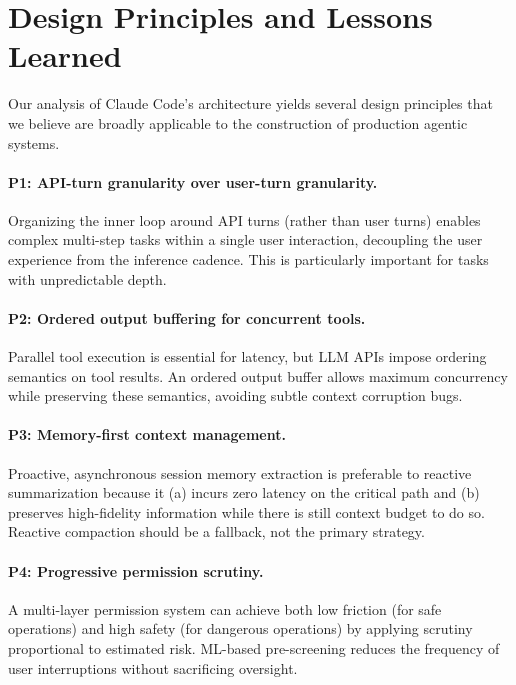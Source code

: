 \documentclass{article}
\begin{document}
\section{Design Principles and Lessons Learned}

Our analysis of Claude Code's architecture yields several design principles that we believe are broadly applicable to the construction of production agentic systems.

\paragraph{P1: API-turn granularity over user-turn granularity.}
Organizing the inner loop around API turns (rather than user turns) enables complex multi-step tasks within a single user interaction, decoupling the user experience from the inference cadence. This is particularly important for tasks with unpredictable depth.

\paragraph{P2: Ordered output buffering for concurrent tools.}
Parallel tool execution is essential for latency, but LLM APIs impose ordering semantics on tool results. An ordered output buffer allows maximum concurrency while preserving these semantics, avoiding subtle context corruption bugs.

\paragraph{P3: Memory-first context management.}
Proactive, asynchronous session memory extraction is preferable to reactive summarization because it (a) incurs zero latency on the critical path and (b) preserves high-fidelity information while there is still context budget to do so. Reactive compaction should be a fallback, not the primary strategy.

\paragraph{P4: Progressive permission scrutiny.}
A multi-layer permission system can achieve both low friction (for safe operations) and high safety (for dangerous operations) by applying scrutiny proportional to estimated risk. ML-based pre-screening reduces the frequency of user interruptions without sacrificing oversight.
\end{document}
